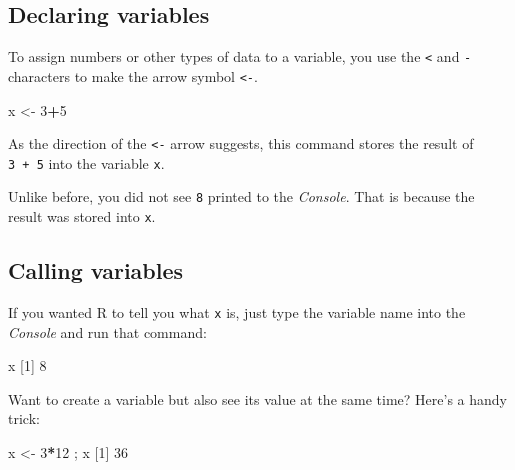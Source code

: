 \documentclass[
]{book}
\newenvironment{Shaded}{\begin{snugshade}}{\end{snugshade}}
\newcommand{\DecValTok}[1]{\textcolor[rgb]{0.00,0.00,0.81}{#1}}
\newcommand{\NormalTok}[1]{#1}
\newcommand{\OperatorTok}[1]{\textcolor[rgb]{0.81,0.36,0.00}{\textbf{#1}}}
\newcommand{\StringTok}[1]{\textcolor[rgb]{0.31,0.60,0.02}{#1}}
\begin{document}
\hypertarget{declaring-variables}{%
\subsection*{Declaring variables}\label{declaring-variables}}

To assign numbers or other types of data to a variable, you use the \texttt{\textless{}} and \texttt{-} characters to make the arrow symbol \texttt{\textless{}-}.

\begin{Shaded}
\begin{Highlighting}[]
\NormalTok{x <-}\StringTok{ }\DecValTok{3}\OperatorTok{+}\DecValTok{5}
\end{Highlighting}
\end{Shaded}

As the direction of the \texttt{\textless{}-} arrow suggests, this command stores the result of \texttt{3\ +\ 5} into the variable \texttt{x}.

Unlike before, you did not see \texttt{8} printed to the \emph{Console}. That is because the result was stored into \texttt{x}.

\hypertarget{calling-variables}{%
\subsection*{Calling variables}\label{calling-variables}}

If you wanted R to tell you what \texttt{x} is, just type the variable name into the \emph{Console} and run that command:

\begin{Shaded}
\begin{Highlighting}[]
\NormalTok{x}
\NormalTok{[}\DecValTok{1}\NormalTok{] }\DecValTok{8}
\end{Highlighting}
\end{Shaded}

Want to create a variable but also see its value at the same time? Here's a handy trick:

\begin{Shaded}
\begin{Highlighting}[]
\NormalTok{x <-}\StringTok{ }\DecValTok{3}\OperatorTok{*}\DecValTok{12}\NormalTok{ ; x}
\NormalTok{[}\DecValTok{1}\NormalTok{] }\DecValTok{36}
\end{Highlighting}
\end{Shaded}
\end{document}
